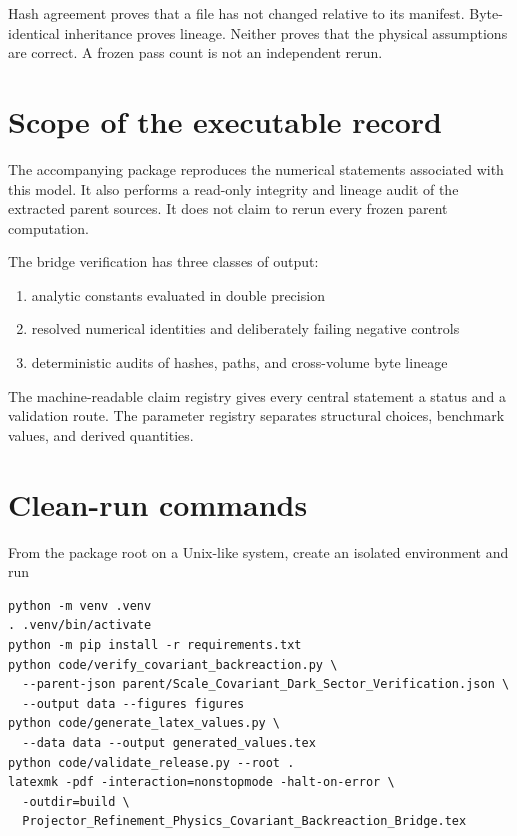 \begin{statusbox}
Hash agreement proves that a file has not changed relative to its manifest.  Byte-identical inheritance proves lineage.  Neither proves that the physical assumptions are correct.  A frozen pass count is not an independent rerun.
\end{statusbox}


\section{Scope of the executable record}

The accompanying package reproduces the numerical statements associated with this model.  It also performs a read-only integrity and lineage audit of the extracted parent sources.  It does not claim to rerun every frozen parent computation.

The bridge verification has three classes of output:
\begin{enumerate}[leftmargin=2.2em]
\item analytic constants evaluated in double precision
\item resolved numerical identities and deliberately failing negative controls
\item deterministic audits of hashes, paths, and cross-volume byte lineage
\end{enumerate}

The machine-readable claim registry gives every central statement a status and a validation route.  The parameter registry separates structural choices, benchmark values, and derived quantities.

\section{Clean-run commands}

From the package root on a Unix-like system, create an isolated environment and run
\begin{verbatim}
python -m venv .venv
. .venv/bin/activate
python -m pip install -r requirements.txt
python code/verify_covariant_backreaction.py \
  --parent-json parent/Scale_Covariant_Dark_Sector_Verification.json \
  --output data --figures figures
python code/generate_latex_values.py \
  --data data --output generated_values.tex
python code/validate_release.py --root .
latexmk -pdf -interaction=nonstopmode -halt-on-error \
  -outdir=build \
  Projector_Refinement_Physics_Covariant_Backreaction_Bridge.tex
\end{verbatim}


